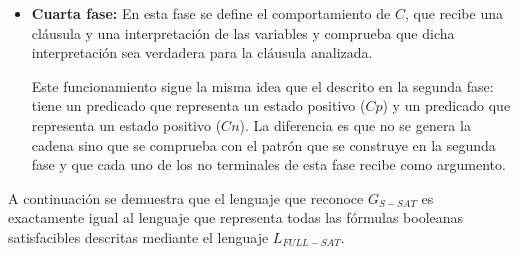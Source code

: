 \documentclass[12pt]{article}
\begin{document}
\begin{itemize}
    \item \textbf{Cuarta fase:} En esta fase se define el comportamiento de $C$, que recibe una cláusula y una
          interpretación de las variables y comprueba que dicha interpretación sea verdadera para la cláusula analizada.
          \begin{enumerate}[start=23]
          \end{enumerate}
          
          Este funcionamiento sigue la misma idea que el descrito en la segunda fase: tiene un predicado que representa un estado positivo ($Cp$) y un predicado que representa un estado positivo ($Cn$). La diferencia es que no se genera la cadena sino que se comprueba con el patrón que se construye en la segunda fase y que cada uno de los no terminales de esta fase recibe como argumento.        
\end{itemize}

A continuación se demuestra que el lenguaje que reconoce $G_{S-SAT}$ es exactamente igual al lenguaje que representa todas las fórmulas booleanas satisfacibles descritas mediante el lenguaje $L_{FULL-SAT}$.
\end{document}
